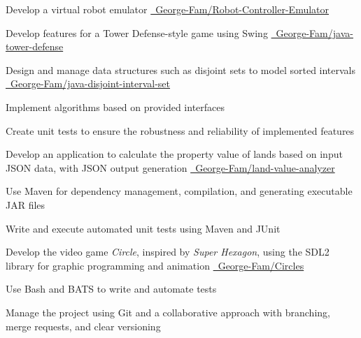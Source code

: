 \documentclass[letterpaper,10pt]{article}
\begin{document}
  \begin{resume_list}
    \item Develop a virtual robot emulator {\small \href{https://github.com/George-Fam/Robot-Controller-Emulator}{\faGithubSquare\ George-Fam/Robot-Controller-Emulator}}
    \vspace{2pt}
    \item Develop features for a Tower Defense-style game using Swing {\small \href{https://github.com/George-Fam/java-tower-defense}{\faGithubSquare\ George-Fam/java-tower-defense}}
    \vspace{2pt}
    \item Design and manage data structures such as disjoint sets to model sorted intervals {\small \href{https://github.com/George-Fam/java-disjoint-interval-set}{\faGithubSquare\ George-Fam/java-disjoint-interval-set}}
    \vspace{2pt}
    \item Implement algorithms based on provided interfaces
    \vspace{2pt}
    \item Create unit tests to ensure the robustness and reliability of implemented features
  \end{resume_list}

  \begin{resume_list}
    \item Develop an application to calculate the property value of lands based on input JSON data, with JSON output generation {\small \href{https://github.com/George-Fam/land-value-analyzer}{\faGithubSquare\ George-Fam/land-value-analyzer}}
    \vspace{2pt}
    \item Use Maven for dependency management, compilation, and generating executable JAR files
    \vspace{2pt}
    \item Write and execute automated unit tests using Maven and JUnit
  \end{resume_list}
  
  \begin{resume_list}
    \item Develop the video game \textit{Circle}, inspired by \textit{Super Hexagon}, using the SDL2 library for graphic programming and animation {\small \href{https://github.com/George-Fam/Circles}{\faGithubSquare\ George-Fam/Circles}}
    \vspace{2pt}
    \item Use Bash and BATS to write and automate tests
    \vspace{2pt}
    \item Manage the project using Git and a collaborative approach with branching, merge requests, and clear versioning
  \end{resume_list}
\end{document}

